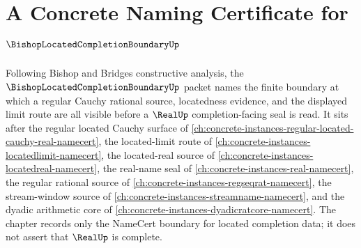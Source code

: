 \chapter{A Concrete Naming Certificate for $\BishopLocatedCompletionBoundaryUp$}
\label{ch:concrete-instances-bishoplocatedcompletionboundary-namecert}

Following Bishop and Bridges constructive analysis, the $\BishopLocatedCompletionBoundaryUp$ packet names the finite boundary at which a regular Cauchy rational source, locatedness evidence, and the displayed limit route are all visible before a $\RealUp$ completion-facing seal is read. It sits after the regular located Cauchy surface of \autoref{ch:concrete-instances-regular-located-cauchy-real-namecert}, the located-limit route of \autoref{ch:concrete-instances-locatedlimit-namecert}, the located-real source of \autoref{ch:concrete-instances-locatedreal-namecert}, the real-name seal of \autoref{ch:concrete-instances-real-namecert}, the regular rational source of \autoref{ch:concrete-instances-regseqrat-namecert}, the stream-window source of \autoref{ch:concrete-instances-streamname-namecert}, and the dyadic arithmetic core of \autoref{ch:concrete-instances-dyadicratcore-namecert}. The chapter records only the NameCert boundary for located completion data; it does not assert that $\RealUp$ is complete.

